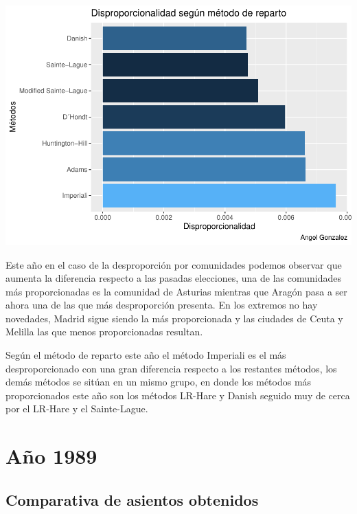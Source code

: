 \documentclass[12pt,a4paper,]{book}
\numberwithin{dummy}{section}
\theoremstyle{ocrenumbox}
\theoremstyle{blacknumex}
\theoremstyle{blacknumbox}
\theoremstyle{ocrenum}
\theoremstyle{ocrenum}
\begin{document}
\begin{center}\includegraphics[width=1\linewidth]{figurasR/unnamed-chunk-15-2} \end{center}

Este año en el caso de la desproporción por comunidades podemos observar
que aumenta la diferencia respecto a las pasadas elecciones, una de las
comunidades más proporcionadas es la comunidad de Asturias mientras que
Aragón pasa a ser ahora una de las que más desproporción presenta. En
los extremos no hay novedades, Madrid sigue siendo la más proporcionada
y las ciudades de Ceuta y Melilla las que menos proporcionadas resultan.

Según el método de reparto este año el método Imperiali es el más
desproporcionado con una gran diferencia respecto a los restantes
métodos, los demás métodos se sitúan en un mismo grupo, en donde los
métodos más proporcionados este año son los métodos LR-Hare y Danish
seguido muy de cerca por el LR-Hare y el Sainte-Lague.

\hypertarget{auxf1o-1989}{%
\section{Año 1989}\label{auxf1o-1989}}

\hypertarget{comparativa-de-asientos-obtenidos-4}{%
\subsection{Comparativa de asientos
obtenidos}\label{comparativa-de-asientos-obtenidos-4}}
\end{document}
